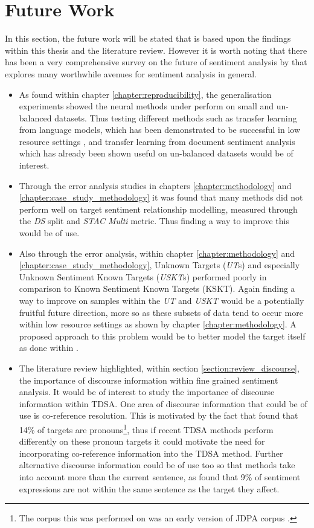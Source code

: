 \section{Future Work}
In this section, the future work will be stated that is based upon the findings within this thesis and the literature review. However it is worth noting that there has been a very comprehensive survey on the future of sentiment analysis by \citet{poria2020beneath} that explores many worthwhile avenues for sentiment analysis in general.
\begin{itemize}
    \item As found within chapter \ref{chapter:reproducibility}, the generalisation experiments showed the neural methods under perform on small and un-balanced datasets. Thus testing different methods such as transfer learning from language models, which has been demonstrated to be successful in low resource settings \citep{howard-ruder-2018-universal}, and transfer learning from document sentiment analysis which has already been shown useful on un-balanced datasets \citep{he-etal-2018-exploiting} would be of interest.
    \item Through the error analysis studies in chapters \ref{chapter:methodology} and \ref{chapter:case_study_methodology} it was found that many methods did not perform well on target sentiment relationship modelling, measured through the \textit{DS} split and \textit{STAC Multi} metric. Thus finding a way to improve this would be of use.
    \item Also through the error analysis, within chapter \ref{chapter:methodology} and \ref{chapter:case_study_methodology}, Unknown Targets (\textit{UT}s) and especially Unknown Sentiment Known Targets (\textit{USKT}s) performed poorly in comparison to Known Sentiment Known Targets (KSKT). Again finding a way to improve on samples within the \textit{UT} and \textit{USKT} would be a potentially fruitful future direction, more so as these subsets of data tend to occur more within low resource settings as shown by chapter \ref{chapter:methodology}. A proposed approach to this problem would be to better model the target itself as done within \citet{he-etal-2018-effective}.
    \item The literature review highlighted, within section \ref{section:review_discourse}, the importance of discourse information within fine grained sentiment analysis. It would be of interest to study the importance of discourse information within TDSA. One area of discourse information that could be of use is co-reference resolution. This is motivated by the fact that \citet{kessler2009targeting} found that 14\% of targets are pronouns\footnote{The corpus this was performed on was an early version of JDPA corpus \citep{kessler2010icwsm}.}, thus if recent TDSA methods perform differently on these pronoun targets it could motivate the need for incorporating co-reference information into the TDSA method. Further alternative discourse information could be of use too so that methods take into account more than the current sentence, as \citet{kessler2010icwsm} found that 9\% of sentiment expressions are not within the same sentence as the target they affect.

\end{itemize}
